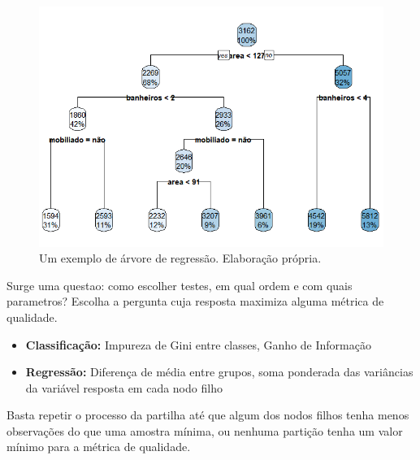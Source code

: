\documentclass{beamer} %
\newcommand{\1}{\mathbb{I}}
\begin{document}
\begin{frame}

\begin{figure}[H]
    \centering
    \includegraphics[scale = .55]{imagens/arvore_decisao_houses.png}
    \caption{Um exemplo de árvore de regressão. Elaboração própria.}
    \label{fig:arvore_reg}
\end{figure}
\end{frame}




\begin{frame}
Surge uma questao: como escolher testes, em qual ordem e com quais parametros? Escolha a pergunta cuja resposta maximiza alguma métrica de qualidade.

\begin{itemize}
    \item \textbf{Classificação:} Impureza de Gini entre classes, Ganho de Informação 
    \item \textbf{Regressão:} Diferença de média entre grupos, soma ponderada das variâncias da variável resposta em cada nodo filho
\end{itemize}

Basta repetir o processo da partilha até que algum dos nodos filhos tenha menos observações do que uma amostra mínima, ou nenhuma partição tenha um valor mínimo para a métrica de qualidade.


\end{frame}
\end{document}
